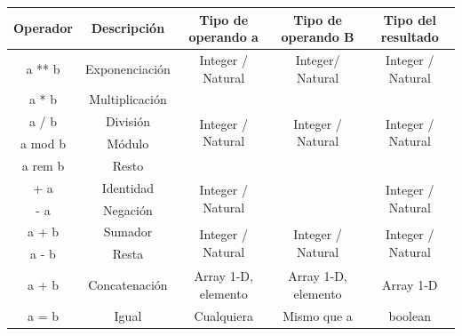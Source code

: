 \begin{table}[H]
	\begin{tabular}{|c|c|c|c|c|}
		\hline
		\rowcolor{gray}
		Operador & Descripción       & Tipo de operando a                          & Tipo de operando B                 & Tipo del resultado                 \\
		\hline
		a ** b   & Exponenciación    & Integer / Natural                           & Integer/ Natural                   & Integer / Natural                  \\
		\hline
		a * b    & Multiplicación    & \multirow{4}{*}{Integer / Natural}          & \multirow{4}{*}{Integer / Natural} & \multirow{4}{*}{Integer / Natural} \\
		\cline{1-2}
		a / b    & División          &                                             &                                    &                                    \\
		\cline{1-2}
		a mod b  & Módulo            &                                             &                                    &                                    \\
		\cline{1-2}
		a rem b  & Resto             &                                             &                                    &                                    \\
		\hline
		+ a      & Identidad         & \multirow{2}{*}{Integer / Natural}          &                                    & \multirow{2}{*}{Integer / Natural} \\
		\cline{1-2}
		- a      & Negación          &                                             &                                    &                                    \\
		\hline
		a + b    & Sumador           & \multirow{2}{*}{Integer / Natural}          & \multirow{2}{*}{Integer / Natural} & \multirow{2}{*}{Integer / Natural} \\
		\cline{1-2}
		a - b    & Resta             &                                             &                                    &                                    \\
		\hline
		a + b    & Concatenación     & Array 1-D, elemento                         & Array 1-D, elemento                & Array 1-D                          \\
		\hline
		a = b    & Igual             & \multirow{2}{*}{Cualquiera}                 & \multirow{2}{*}{Mismo que a}       & \multirow{2}{*}{boolean}           \\

\end{tabular}
\end{table}
